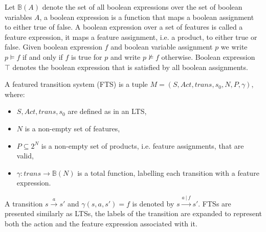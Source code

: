 Let $\mathbb{B}(A)$ denote the set of all boolean expressions over the set of boolean variables $A$, a boolean expression is a function that maps a boolean assignment to either true of false. A boolean expression over a set of features is called a feature expression, it maps a feature assignment, i.e. a product, to either true or false. Given boolean expression $f$ and boolean variable assignment $p$ we write $p \models f$ if and only if $f$ is true for $p$ and write $p \not\models f$ otherwise. Boolean expression $\top$ denotes the boolean expression that is satisfied by all boolean assignments.
\begin{definition}
	\label{def_fts} A featured transition system (FTS) is a tuple $M = (S, Act, trans, s_0, N, P, \gamma)$, where:
	\begin{itemize}
		\item $S, Act, trans, s_0$ are defined as in an LTS,
		\item $N$ is a non-empty set of features,
		\item $P \subseteq 2^N$ is a non-empty set of products, i.e. feature assignments, that are valid,
		\item $\gamma : trans \rightarrow \mathbb{B}(N)$ is a total function, labelling each transition with a feature expression.
	\end{itemize}
\end{definition}
A transition $s \xrightarrow a s'$ and $\gamma(s,a,s') = f$ is denoted by $s \xrightarrow {a\ |\ f} s'$. FTSs are presented similarly as LTSs, the labels of the transition are expanded to represent both the action and the feature expression associated with it.

